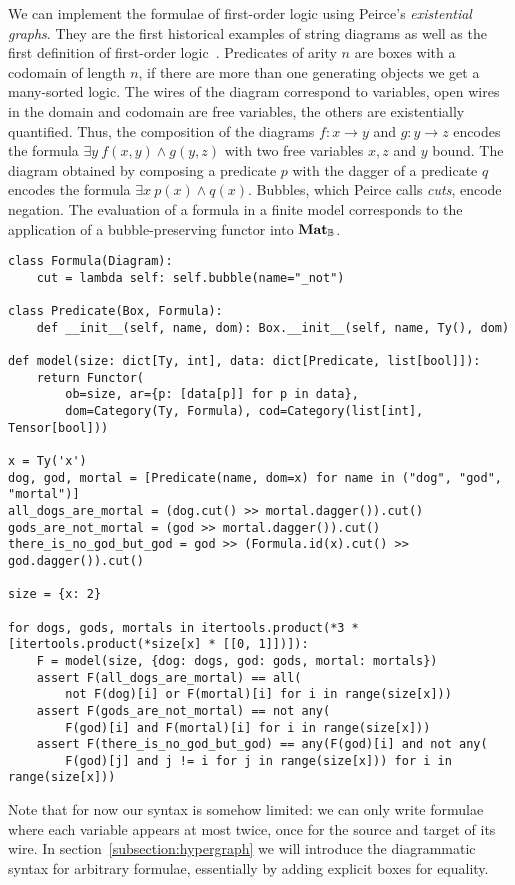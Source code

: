 \begin{example}\label{example:monoidal-formula}
We can implement the formulae of first-order logic using Peirce's \emph{existential graphs}.
They are the first historical examples of string diagrams as well as the first definition of first-order logic~\cite{BradyTrimble98,BradyTrimble00,MelliesZeilberger16,HaydonSobocinski20}.
Predicates of arity $n$ are boxes with a codomain of length $n$, if there are more than one generating objects we get a many-sorted logic.
The wires of the diagram correspond to variables, open wires in the domain and codomain are free variables, the others are existentially quantified.
Thus, the composition of the diagrams $f : x \to y$ and $g : y \to z$ encodes the formula $\exists y \ f(x, y) \land g(y, z)$ with two free variables $x, z$ and $y$ bound.
The diagram obtained by composing a predicate $p$ with the dagger of a predicate $q$ encodes the formula $\exists x \ p(x) \land q(x)$.
Bubbles, which Peirce calls \emph{cuts}, encode negation.
The evaluation of a formula in a finite model corresponds to the application of a bubble-preserving functor into $\mathbf{Mat}_{\mathbb{B}}$.

\begin{verbatim}
class Formula(Diagram):
    cut = lambda self: self.bubble(name="_not")

class Predicate(Box, Formula):
    def __init__(self, name, dom): Box.__init__(self, name, Ty(), dom)

def model(size: dict[Ty, int], data: dict[Predicate, list[bool]]):
    return Functor(
        ob=size, ar={p: [data[p]] for p in data},
        dom=Category(Ty, Formula), cod=Category(list[int], Tensor[bool]))

x = Ty('x')
dog, god, mortal = [Predicate(name, dom=x) for name in ("dog", "god", "mortal")]
all_dogs_are_mortal = (dog.cut() >> mortal.dagger()).cut()
gods_are_not_mortal = (god >> mortal.dagger()).cut()
there_is_no_god_but_god = god >> (Formula.id(x).cut() >> god.dagger()).cut()

size = {x: 2}

for dogs, gods, mortals in itertools.product(*3 * [itertools.product(*size[x] * [[0, 1]])]):
    F = model(size, {dog: dogs, god: gods, mortal: mortals})
    assert F(all_dogs_are_mortal) == all(
        not F(dog)[i] or F(mortal)[i] for i in range(size[x]))
    assert F(gods_are_not_mortal) == not any(
        F(god)[i] and F(mortal)[i] for i in range(size[x]))
    assert F(there_is_no_god_but_god) == any(F(god)[i] and not any(
        F(god)[j] and j != i for j in range(size[x])) for i in range(size[x]))
\end{verbatim}

Note that for now our syntax is somehow limited: we can only write formulae where each variable appears at most twice, once for the source and target of its wire.
In section~\ref{subsection:hypergraph} we will introduce the diagrammatic syntax for arbitrary formulae, essentially by adding explicit boxes for equality.
\end{example}

